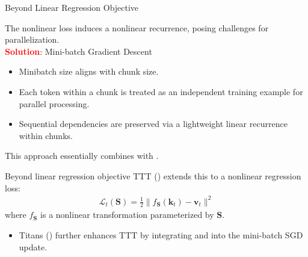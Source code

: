   \begin{frame}{Beyond Linear Regression Objective}

    The nonlinear loss induces a nonlinear recurrence, posing challenges for parallelization. \\
    \vspace{0.5em}
    \textcolor{red}{\textbf{Solution}}: Mini-batch Gradient Descent
    \begin{itemize}
        \item Minibatch size aligns with chunk size.
        \item Each token within a chunk is treated as an independent training example for parallel processing.
        \item Sequential dependencies are preserved via a lightweight linear recurrence within chunks.
    \end{itemize}
    \vspace{0.5em}
     This approach essentially combines {\color{red}{intra-chunk linear recurrence}} with {\color{red}{inter-chunk nonlinear recurrence}}.
\end{frame}

  \begin{frame}{Beyond linear regression objective}
    TTT (\cite{sun2024learning}) extends this to a nonlinear regression loss:
    \begin{align*}
      \mathcal{L}_t(\mathbf{S}) = \frac{1}{2}\|f_{\mathbf{S}}(\mathbf{k}_t) - \mathbf{v}_t\|^2
    \end{align*}
    where $f_{\mathbf{S}}$ is a nonlinear transformation parameterized by $\mathbf{S}$.

    \begin{itemize}
        \item Titans (\cite{behrouz2024titanslearningmemorizetest}) further enhances TTT by integrating {\color{red}{momentum}} and {\color{red}{weight decay}} into the mini-batch SGD update.
    \end{itemize}
  \end{frame}




